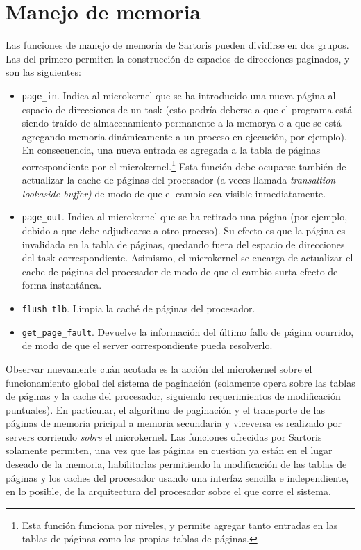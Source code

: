 \documentclass[11pt, letterpaper, twoside]{book}
\begin{document}
\section{Manejo de memoria}

Las funciones de manejo de memoria de Sartoris pueden dividirse en dos grupos. Las del primero permiten la construcci\'on de espacios de direcciones paginados, y son las siguientes:

\begin{itemize}

\item[] \texttt{page\_in}. Indica al microkernel que se ha introducido una nueva p\'agina al espacio de direcciones de un task (esto podr\'ia deberse a que el programa est\'a siendo tra\'ido de almacenamiento permanente a la memorya o a que se est\'a agregando memoria din\'amicamente a un proceso en ejecuci\'on, por ejemplo). En consecuencia, una nueva entrada es agregada a la tabla de p\'aginas correspondiente por el microkernel.\footnote{Esta funci\'on funciona por niveles, y permite agregar tanto entradas en las tablas de p\'aginas como las propias tablas de p\'aginas.} Esta funci\'on debe ocuparse tambi\'en de actualizar la cache de p\'aginas del procesador (a veces llamada \emph{transaltion lookaside buffer)} de modo de que el cambio sea visible inmediatamente.
\item[] \texttt{page\_out}. Indica al microkernel que se ha retirado una p\'agina (por ejemplo, debido a que debe adjudicarse a otro proceso). Su efecto es que la p\'agina es invalidada en la tabla de p\'aginas, quedando fuera del espacio de direcciones del task correspondiente. Asimismo, el microkernel se encarga de actualizar el cache de p\'aginas del procesador de modo de que el cambio surta efecto de forma instant\'anea.
\item[] \texttt{flush\_tlb}. Limpia la cach\'e de p\'aginas del procesador.
\item[] \texttt{get\_page\_fault}. Devuelve la informaci\'on del \'ultimo fallo de p\'agina ocurrido, de modo de que el server correspondiente pueda resolverlo.

\end{itemize}

Observar nuevamente cu\'an acotada es la acci\'on del microkernel sobre el funcionamiento global del sistema de paginaci\'on (solamente opera sobre las tablas de p\'aginas y la cache del procesador, siguiendo requerimientos de modificaci\'on puntuales). En particular, el algoritmo de paginaci\'on y el transporte de las p\'aginas de memoria pricipal a memoria secundaria y viceversa es realizado por servers corriendo \emph{sobre} el microkernel. Las funciones ofrecidas por Sartoris solamente permiten, una vez que las p\'aginas en cuestion ya est\'an en el lugar deseado de la memoria, habilitarlas permitiendo la modificaci\'on de las tablas de p\'aginas y los caches del procesador usando una interfaz sencilla e independiente, en lo posible, de la arquitectura del procesador sobre el que corre el sistema.
\end{document}
